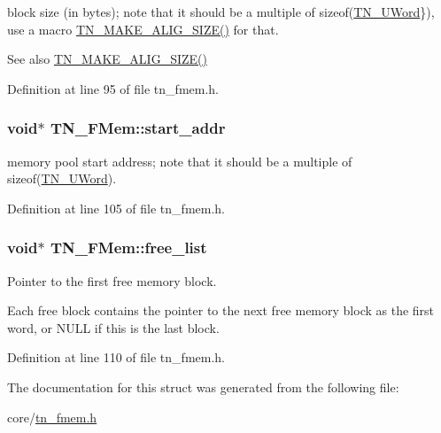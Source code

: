 block size (in bytes); note that it should be a multiple of {\ttfamily sizeof(\hyperlink{tn__arch__example_8h_ab80cba0fe9ffcd9011d53dfeb9e39bf4}{T\+N\+\_\+\+U\+Word}\})}, use a macro {\ttfamily \hyperlink{tn__common_8h_a3f48380e8a624edc643319a81192d88e}{T\+N\+\_\+\+M\+A\+K\+E\+\_\+\+A\+L\+I\+G\+\_\+\+S\+I\+Z\+E()}} for that. 

\begin{DoxySeeAlso}{See also}
{\ttfamily \hyperlink{tn__common_8h_a3f48380e8a624edc643319a81192d88e}{T\+N\+\_\+\+M\+A\+K\+E\+\_\+\+A\+L\+I\+G\+\_\+\+S\+I\+Z\+E()}} 
\end{DoxySeeAlso}


Definition at line 95 of file tn\+\_\+fmem.\+h.

\hypertarget{structTN__FMem_a7eac768da37c99efd90ae56ebde527cf}{
\subsubsection[{start\+\_\+addr}]{\setlength{\rightskip}{0pt plus 5cm}void$\ast$ T\+N\+\_\+\+F\+Mem\+::start\+\_\+addr}}\label{structTN__FMem_a7eac768da37c99efd90ae56ebde527cf}


memory pool start address; note that it should be a multiple of {\ttfamily sizeof(\hyperlink{tn__arch__example_8h_ab80cba0fe9ffcd9011d53dfeb9e39bf4}{T\+N\+\_\+\+U\+Word})}. 



Definition at line 105 of file tn\+\_\+fmem.\+h.

\hypertarget{structTN__FMem_a00ffa3c416a57946d95ab8814168eedb}{
\subsubsection[{free\+\_\+list}]{\setlength{\rightskip}{0pt plus 5cm}void$\ast$ T\+N\+\_\+\+F\+Mem\+::free\+\_\+list}}\label{structTN__FMem_a00ffa3c416a57946d95ab8814168eedb}


Pointer to the first free memory block. 

Each free block contains the pointer to the next free memory block as the first word, or {\ttfamily N\+U\+L\+L} if this is the last block. 

Definition at line 110 of file tn\+\_\+fmem.\+h.



The documentation for this struct was generated from the following file\+:\begin{DoxyCompactItemize}
\item 
core/\hyperlink{tn__fmem_8h}{tn\+\_\+fmem.\+h}\end{DoxyCompactItemize}
